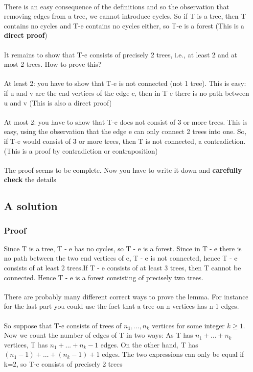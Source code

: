\documentclass{article}[18pt]
\begin{document}
\\
There is an easy consequence of the definitions and so the observation that removing edges from a tree, we cannot introduce cycles. So if T is a tree, then T contains no cycles and T-e contains no cycles either, so T-e is a forest (This is a \textbf{direct proof})\\
\\
It remains to show that T-e consists of precisely 2 trees, i.e., at least 2 and at most 2 trees. How to prove this?\\
\\
At least 2: you have to show that T-e is not connected (not 1 tree). This is easy: if u and v are the end vertices of the edge e, then in T-e there is no path between u and v (This is also a direct proof)\\
\\
At most 2: you have to show that T-e does not consist of 3 or more trees. This is easy, using the observation that the edge e can only connect 2 trees into one. So, if T-e would consist of 3 or more trees, then T is not connected, a contradiction. (This is a proof by contradiction or contraposition)\\
\\
The proof seems to be complete. Now you have to write it down and \textbf{carefully check} the details
\subsection{A solution}
\subsubsection{Proof}
Since T is a tree, T - e has no cycles, so T - e is a forest. Since in T - e there
is no path between the two end vertices of e, T - e is not connected, hence T - e
consists of at least 2 trees.If T - e consists of at least 3 trees, then T cannot be
connected. Hence T - e is a forest consisting of precisely two trees.\\
\\
There are probably many different correct ways to prove the lemma. For instance for the last part you could use the fact that a tree on n vertices has n-1 edges.\\
\\
So suppose that T-e consists of trees of $n_1,...,n_k$ vertices for some integer $k\geqslant 1$. Now we count the number of edges of T in two ways: As T has $n_1+...+n_k$ vertices, T has $n_1+...+n_k-1$ edges. On the other hand, T has $(n_1-1)+...+(n_k-1)+1$ edges. The two expressions can only be equal if k=2, so T-e consists of precisely 2 trees
\end{document}
